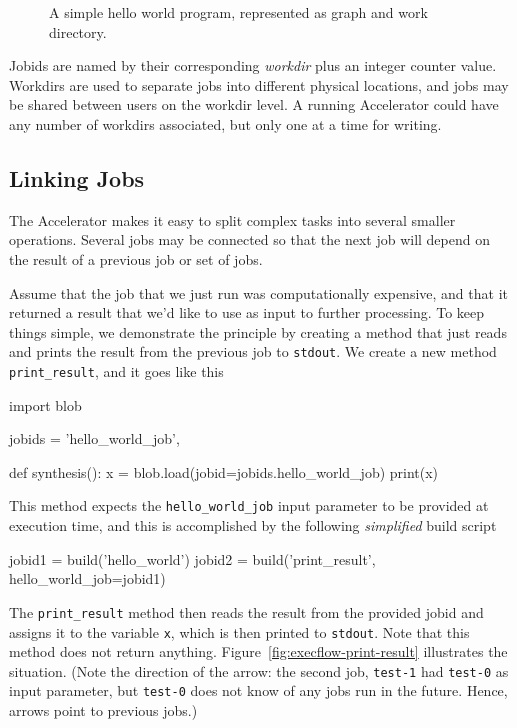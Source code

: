 \begin{figure}[h!]
  \begin{center}
    
    \caption{A simple hello world program, represented as graph and
      work directory.}
    \label{fig:execflow-hello-world}
  \end{center}
\end{figure}

Jobids are named by their corresponding \textsl{workdir} plus an
integer counter value.  Workdirs are used to separate jobs into
different physical locations, and jobs may be shared between users on
the workdir level.  A running Accelerator could have any number of
workdirs associated, but only one at a time for writing.



\subsection{Linking Jobs}

The Accelerator makes it easy to split complex tasks into several
smaller operations.  Several jobs may be connected so that the next
job will depend on the result of a previous job or set of jobs.

Assume that the job that we just run was computationally expensive,
and that it returned a result that we'd like to use as input to
further processing.  To keep things simple, we demonstrate the
principle by creating a method that just reads and prints the result
from the previous job to
\texttt{stdout}.  We create a new method \texttt{print\_result}, and it
goes like this
\begin{python}
import blob

jobids = {'hello_world_job',}

def synthesis():
    x = blob.load(jobid=jobids.hello_world_job)
    print(x)
\end{python}
This method expects the \texttt{hello\_world\_job} input parameter to
be provided at execution time, and this is accomplished by the
following \textsl{simplified} build script
\begin{python}
jobid1 = build('hello_world')
jobid2 = build('print_result', hello_world_job=jobid1)
\end{python}
The \texttt{print\_result} method then reads the result from the
provided jobid and assigns it to the variable \texttt{x}, which is
then printed to \texttt{stdout}.  Note that this method does not
return anything.  Figure~\ref{fig:execflow-print-result} illustrates
the situation.  (Note the direction of the arrow: the second job,
\texttt{test-1} had \texttt{test-0} as input parameter, but
\texttt{test-0} does not know of any jobs run in the future.  Hence,
arrows point to previous jobs.)

